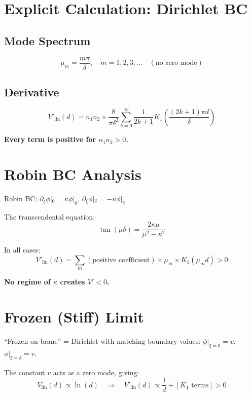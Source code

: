\documentclass[11pt,a4paper]{article}
\begin{document}
\section{Explicit Calculation: Dirichlet BC}

\subsection{Mode Spectrum}
\begin{equation}
\mu_m = \frac{m\pi}{\delta}, \quad m = 1, 2, 3, \ldots \quad (\text{no zero mode})
\end{equation}

\subsection{Derivative}
\begin{equation}
V'_{\mathrm{lin}}(d) = n_1 n_2 \times \frac{8}{\pi\delta^2}
\sum_{k=0}^{\infty} \frac{1}{2k+1} K_1\!\left(\frac{(2k+1)\pi d}{\delta}\right)
\end{equation}

\textbf{Every term is positive for $n_1 n_2 > 0$.}

\section{Robin BC Analysis}

Robin BC: $\partial_\xi\phi|_0 = \kappa\phi|_0$, $\partial_\xi\phi|_\delta = -\kappa\phi|_\delta$

The transcendental equation:
\begin{equation}
\tan(\mu\delta) = \frac{2\kappa\mu}{\mu^2 - \kappa^2}
\end{equation}

In all cases:
\begin{equation}
V'_{\mathrm{lin}}(d) = \sum_m (\text{positive coefficient}) \times \mu_m \times K_1(\mu_m d) > 0
\end{equation}

\textbf{No regime of $\kappa$ creates $V' < 0$.}

\section{Frozen (Stiff) Limit}

``Frozen on brane'' = Dirichlet with matching boundary values: $\phi|_{\xi=0} = v$, $\phi|_{\xi=\delta} = v$.

The constant $v$ acts as a zero mode, giving:
\begin{equation}
V_{\mathrm{lin}}(d) \propto \ln(d) \quad\Rightarrow\quad V'_{\mathrm{lin}}(d) \propto \frac{1}{d} + [K_1 \text{ terms}] > 0
\end{equation}
\end{document}
